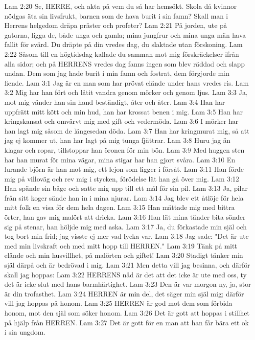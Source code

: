 Lam 2:20  Se, HERRE, och akta på vem du så har hemsökt. Skola då kvinnor nödgas äta sin livsfrukt, barnen som de hava burit i sin famn? Skall man i Herrens helgedom dräpa präster och profeter?
Lam 2:21  På jorden, ute på gatorna, ligga de, både unga och gamla; mina jungfrur och mina unga män hava fallit för svärd. Du dräpte på din vredes dag, du slaktade utan förskoning.
Lam 2:22  Såsom till en högtidsdag kallade du samman mot mig förskräckelser ifrån alla sidor; och på HERRENS vredes dag fanns ingen som blev räddad och slapp undan. Dem som jag hade burit i min famn och fostrat, dem förgjorde min fiende.
Lam 3:1  Jag är en man som har prövat elände under hans vredes ris.
Lam 3:2  Mig har han fört och låtit vandra genom mörker och genom ljus.
Lam 3:3  Ja, mot mig vänder han sin hand beständigt, åter och åter.
Lam 3:4  Han har uppfrätt mitt kött och min hud, han har krossat benen i mig.
Lam 3:5  Han har kringskansat och omvärvt mig med gift och vedermöda.
Lam 3:6  I mörker har han lagt mig såsom de längesedan döda.
Lam 3:7  Han har kringmurat mig, så att jag ej kommer ut, han har lagt på mig tunga fjättrar.
Lam 3:8  Huru jag än klagar och ropar, tillstoppar han öronen för min bön.
Lam 3:9  Med huggen sten har han murat för mina vägar, mina stigar har han gjort svåra.
Lam 3:10  En lurande björn är han mot mig, ett lejon som ligger i försåt.
Lam 3:11  Han förde mig på villoväg och rev mig i stycken, förödelse lät han gå över mig.
Lam 3:12  Han spände sin båge och satte mig upp till ett mål för sin pil.
Lam 3:13  Ja, pilar från sitt koger sände han in i mina njurar.
Lam 3:14  Jag blev ett åtlöje för hela mitt folk en visa för dem hela dagen.
Lam 3:15  Han mättade mig med bittra örter, han gav mig malört att dricka.
Lam 3:16  Han lät mina tänder bita sönder sig på stenar, han höljde mig med aska.
Lam 3:17  Ja, du förkastade min själ och tog bort min frid; jag visste ej mer vad lycka var.
Lam 3:18  Jag sade: "Det är ute med min livskraft och med mitt hopp till HERREN."
Lam 3:19  Tänk på mitt elände och min husvillhet, på malörten och giftet!
Lam 3:20  Stadigt tänker min själ därpå och är bedrövad i mig.
Lam 3:21  Men detta vill jag besinna, och därför skall jag hoppas:
Lam 3:22  HERRENS nåd är det att det icke är ute med oss, ty det är icke slut med hans barmhärtighet.
Lam 3:23  Den är var morgon ny, ja, stor är din trofasthet.
Lam 3:24  HERREN är min del, det säger min själ mig; därför vill jag hoppas på honom.
Lam 3:25  HERREN är god mot dem som förbida honom, mot den själ som söker honom.
Lam 3:26  Det är gott att hoppas i stillhet på hjälp från HERREN.
Lam 3:27  Det är gott för en man att han får bära ett ok i sin ungdom.
